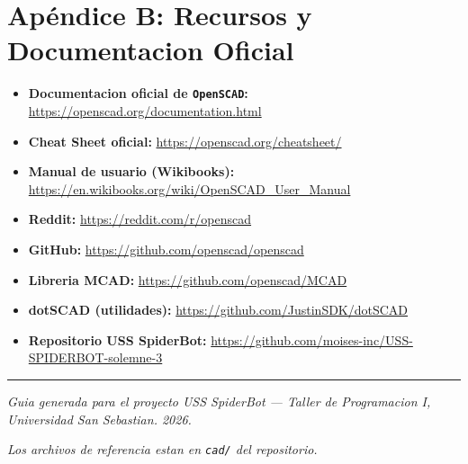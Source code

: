 \documentclass[12pt, oneside, a4paper]{report}
\newcommand{\openscadlogo}{\texttt{OpenSCAD}}
\newcommand{\codigo}[1]{\texttt{#1}}
\begin{document}
\chapter*{Apéndice B: Recursos y Documentacion Oficial}

\begin{itemize}
    \item \textbf{Documentacion oficial de \openscadlogo:} \url{https://openscad.org/documentation.html}
    \item \textbf{Cheat Sheet oficial:} \url{https://openscad.org/cheatsheet/}
    \item \textbf{Manual de usuario (Wikibooks):} \url{https://en.wikibooks.org/wiki/OpenSCAD_User_Manual}
    \item \textbf{Reddit:} \url{https://reddit.com/r/openscad}
    \item \textbf{GitHub:} \url{https://github.com/openscad/openscad}
    \item \textbf{Libreria MCAD:} \url{https://github.com/openscad/MCAD}
    \item \textbf{dotSCAD (utilidades):} \url{https://github.com/JustinSDK/dotSCAD}
    \item \textbf{Repositorio USS SpiderBot:} \url{https://github.com/moises-inc/USS-SPIDERBOT-solemne-3}
\end{itemize}

\vspace{2cm}

\begin{center}
\rule{5cm}{0.4pt}

\small\textit{Guia generada para el proyecto USS SpiderBot --- Taller de Programacion I, Universidad San Sebastian. 2026.}

\small\textit{Los archivos de referencia estan en \codigo{cad/} del repositorio.}
\end{center}
\end{document}
